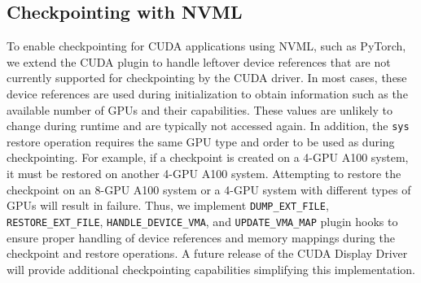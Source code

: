 \subsection{Checkpointing with NVML}
To enable checkpointing for CUDA applications using NVML, such as PyTorch, we extend the CUDA plugin to handle leftover device references that are not currently supported for checkpointing by the CUDA driver. In most cases, these device references are used during initialization to obtain information such as the available number of GPUs and their capabilities. These values are unlikely to change during runtime and are typically not accessed again. In addition, the \texttt{sys} restore operation requires the same GPU type and order to be used as during checkpointing. For example, if a checkpoint is created on a 4-GPU A100 system, it must be restored on another 4-GPU A100 system. Attempting to restore the checkpoint on an 8-GPU A100 system or a 4-GPU system with different types of GPUs will result in failure. Thus, we implement \texttt{DUMP\_EXT\_FILE}, \texttt{RESTORE\_EXT\_FILE}, \texttt{HANDLE\_DEVICE\_VMA}, and \texttt{UPDATE\_VMA\_MAP} plugin hooks to ensure proper handling of device references and memory mappings during the checkpoint and restore operations. A future release of the CUDA Display Driver will provide additional checkpointing capabilities simplifying this implementation.



